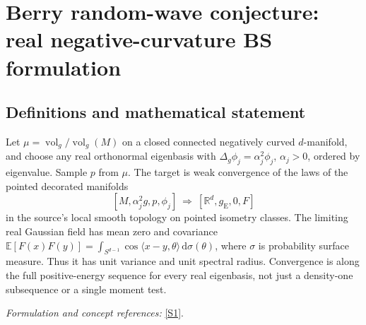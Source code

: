 \documentclass[11pt,a4paper]{article}
\newcommand{\R}{\mathbb{R}}
\newcommand{\E}{\mathbb{E}}
\newcommand{\dd}{\,\mathrm d}
\newcommand{\sref}[2]{\hyperlink{source:#1:#2}{[S#2]}}
\newif\ifshowcatalogue
\newcommand{\cataloguescope}[1]{\ifshowcatalogue
 \paragraph{Exact scope in the supplied catalogue.}
 \begin{quote}\small #1\end{quote}\fi}
\numberwithin{equation}{section}
\begin{document}
\setcounter{section}{0}
\clearpage
\section*{\texorpdfstring{Berry random-wave conjecture: real negative-curvature BS formulation}{Berry random-wave conjecture: real negative-curvature BS formulation}}\label{statement}
\subsection{Definitions and mathematical statement}
Let $\mu=\operatorname{vol}_g/\operatorname{vol}_g(M)$ on a closed connected negatively curved $d$-manifold, and choose any real orthonormal eigenbasis with
$\Delta_g\phi_j=\alpha_j^2\phi_j$, $\alpha_j>0$, ordered by eigenvalue. Sample $p$ from $\mu$. The target is weak convergence of the laws of the pointed decorated manifolds
\[
 [M,\alpha_j^2g,p,\phi_j]\ \Longrightarrow\ [\R^d,g_{\mathrm E},0,F]
\]
in the source's local smooth topology on pointed isometry classes. The limiting real Gaussian field has mean zero and covariance
$\E[F(x)F(y)]=\int_{S^{d-1}}\cos\langle x-y,\theta\rangle\dd\sigma(\theta)$,
where $\sigma$ is probability surface measure. Thus it has unit variance and unit spectral radius. Convergence is along the full positive-energy sequence for every real eigenbasis, not just a density-one subsequence or a single moment test.
\par\smallskip\textit{Formulation and concept references:} \sref{statement}{1}.
\cataloguescope{For every closed connected smooth Riemannian manifold (M,g) of dimension d>=2 with everywhere strictly negative sectional curvature, put mu=dvol\_g/vol\_g(M). For any real orthonormal eigenbasis of L2(M,mu) for the positive Laplace-Beltrami operator, order the eigenvalues nondecreasingly and omit the finite zero-eigenspace; write Delta\_g phi\_j=alpha\_j\textasciicircum{}2 phi\_j with alpha\_j>0. If p is sampled with law mu, does the law of the pointed real-decorated manifold [M,alpha\_j\textasciicircum{}2 g,p,phi\_j] converge weakly, along the full positive-energy sequence, in Abert-Bergeron-Le Masson's local smooth topology on pointed isometry classes of real-decorated d-manifolds, to the law of [R\textasciicircum{}d,g\_Euclidean,0,F]? Here F is the centered real stationary isotropic Gaussian field with covariance E[F(x)F(y)]=integral\_\{S\textasciicircum{}\{d-1\}\} cos(<x-y,theta>) d sigma(theta), where sigma is probability surface measure on the unit sphere (unit variance and unit spectral radius, no extra 2*pi factor).}
\end{document}
